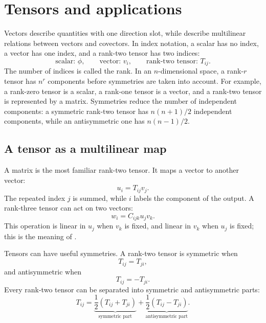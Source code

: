 \section{Tensors and applications}

Vectors describe quantities with one direction slot, while  describe multilinear relations between vectors and covectors. In index notation, a scalar has no index, a vector has one index, and a rank-two tensor has two indices:
\begin{equation}
\text{scalar: }\phi,
\qquad
\text{vector: }v_i,
\qquad
\text{rank-two tensor: }T_{ij}.
\end{equation}
The number of indices is called the rank. In an $n$-dimensional space, a rank-$r$ tensor has $n^r$ components before symmetries are taken into account.
For example, a rank-zero tensor is a scalar, a rank-one tensor is a vector, and a rank-two tensor is represented by a matrix. Symmetries reduce the number of independent components: a symmetric rank-two tensor has $n(n+1)/2$ independent components, while an antisymmetric one has $n(n-1)/2$.

\subsection{A tensor as a multilinear map}
A matrix is the most familiar rank-two tensor. It maps a vector to another vector:
\begin{equation}
u_i=T_{ij}v_j.
\end{equation}
The repeated index $j$ is summed, while $i$ labels the component of the output. A rank-three tensor can act on two vectors:
\begin{equation}
w_i=C_{ijk}u_jv_k.
\end{equation}
This operation is linear in $u_j$ when $v_k$ is fixed, and linear in $v_k$ when $u_j$ is fixed; this is the meaning of .

Tensors can have useful symmetries. A rank-two tensor is symmetric when
\begin{equation}
T_{ij}=T_{ji},
\end{equation}
and antisymmetric when
\begin{equation}
T_{ij}=-T_{ji}.
\end{equation}
Every rank-two tensor can be separated into symmetric and antisymmetric parts:
\begin{equation}
T_{ij}=\underbrace{\frac12(T_{ij}+T_{ji})}_{\text{symmetric part}}
+\underbrace{\frac12(T_{ij}-T_{ji})}_{\text{antisymmetric part}}.
\end{equation}

